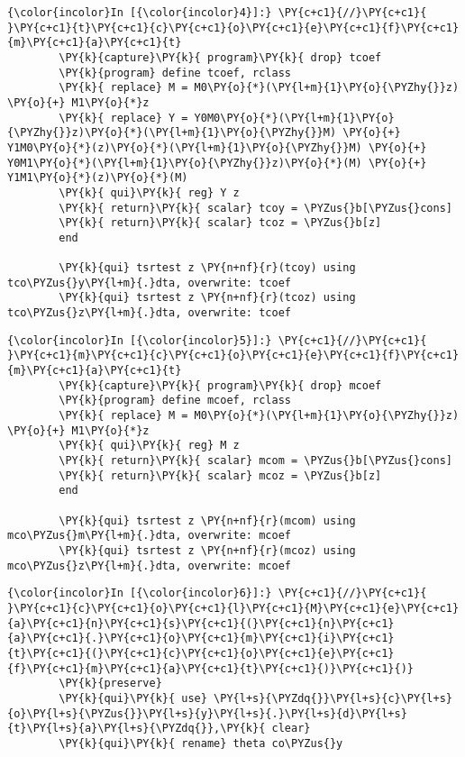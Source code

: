 \documentclass[11pt,notitlepage]{article}\usepackage[]{graphicx}\usepackage[]{color}
\makeatletter
\newenvironment{kframe}{%
 \def\at@end@of@kframe{}%
 \ifinner\ifhmode%
  \def\at@end@of@kframe{\end{minipage}}%
  \begin{minipage}{\columnwidth}%
 \fi\fi%
 \def\FrameCommand##1{\hskip\@totalleftmargin \hskip-\fboxsep
 \colorbox{shadecolor}{##1}\hskip-\fboxsep
     \hskip-\linewidth \hskip-\@totalleftmargin \hskip\columnwidth}%
 \MakeFramed {\advance\hsize-\width
   \@totalleftmargin\z@ \linewidth\hsize
   \@setminipage}}%
 {\par\unskip\endMakeFramed%
 \at@end@of@kframe}
\newenvironment{knitrout}{}{} %
\makeatother
\begin{document}
\begin{enumerate}[a)]
\begin{knitrout}
\begin{kframe}
    \begin{Verbatim}[commandchars=\\\{\}]
{\color{incolor}In [{\color{incolor}4}]:} \PY{c+c1}{//}\PY{c+c1}{ }\PY{c+c1}{t}\PY{c+c1}{c}\PY{c+c1}{o}\PY{c+c1}{e}\PY{c+c1}{f}\PY{c+c1}{m}\PY{c+c1}{a}\PY{c+c1}{t}
        \PY{k}{capture}\PY{k}{ program}\PY{k}{ drop} tcoef
        \PY{k}{program} define tcoef, rclass
        \PY{k}{	replace} M = M0\PY{o}{*}(\PY{l+m}{1}\PY{o}{\PYZhy{}}z) \PY{o}{+} M1\PY{o}{*}z
        \PY{k}{	replace} Y = Y0M0\PY{o}{*}(\PY{l+m}{1}\PY{o}{\PYZhy{}}z)\PY{o}{*}(\PY{l+m}{1}\PY{o}{\PYZhy{}}M) \PY{o}{+} Y1M0\PY{o}{*}(z)\PY{o}{*}(\PY{l+m}{1}\PY{o}{\PYZhy{}}M) \PY{o}{+} Y0M1\PY{o}{*}(\PY{l+m}{1}\PY{o}{\PYZhy{}}z)\PY{o}{*}(M) \PY{o}{+} Y1M1\PY{o}{*}(z)\PY{o}{*}(M)	
        \PY{k}{	qui}\PY{k}{ reg} Y z
        \PY{k}{	return}\PY{k}{ scalar} tcoy = \PYZus{}b[\PYZus{}cons]
        \PY{k}{	return}\PY{k}{ scalar} tcoz = \PYZus{}b[z]
        end
        
        \PY{k}{qui} tsrtest z \PY{n+nf}{r}(tcoy) using tco\PYZus{}y\PY{l+m}{.}dta, overwrite: tcoef
        \PY{k}{qui} tsrtest z \PY{n+nf}{r}(tcoz) using tco\PYZus{}z\PY{l+m}{.}dta, overwrite: tcoef
\end{Verbatim}

    \begin{Verbatim}[commandchars=\\\{\}]
{\color{incolor}In [{\color{incolor}5}]:} \PY{c+c1}{//}\PY{c+c1}{ }\PY{c+c1}{m}\PY{c+c1}{c}\PY{c+c1}{o}\PY{c+c1}{e}\PY{c+c1}{f}\PY{c+c1}{m}\PY{c+c1}{a}\PY{c+c1}{t}
        \PY{k}{capture}\PY{k}{ program}\PY{k}{ drop} mcoef
        \PY{k}{program} define mcoef, rclass
        \PY{k}{	replace} M = M0\PY{o}{*}(\PY{l+m}{1}\PY{o}{\PYZhy{}}z) \PY{o}{+} M1\PY{o}{*}z
        \PY{k}{	qui}\PY{k}{ reg} M z
        \PY{k}{	return}\PY{k}{ scalar} mcom = \PYZus{}b[\PYZus{}cons]
        \PY{k}{	return}\PY{k}{ scalar} mcoz = \PYZus{}b[z]
        end
        
        \PY{k}{qui} tsrtest z \PY{n+nf}{r}(mcom) using mco\PYZus{}m\PY{l+m}{.}dta, overwrite: mcoef 
        \PY{k}{qui} tsrtest z \PY{n+nf}{r}(mcoz) using mco\PYZus{}z\PY{l+m}{.}dta, overwrite: mcoef
\end{Verbatim}

    \begin{Verbatim}[commandchars=\\\{\}]
{\color{incolor}In [{\color{incolor}6}]:} \PY{c+c1}{//}\PY{c+c1}{ }\PY{c+c1}{c}\PY{c+c1}{o}\PY{c+c1}{l}\PY{c+c1}{M}\PY{c+c1}{e}\PY{c+c1}{a}\PY{c+c1}{n}\PY{c+c1}{s}\PY{c+c1}{(}\PY{c+c1}{n}\PY{c+c1}{a}\PY{c+c1}{.}\PY{c+c1}{o}\PY{c+c1}{m}\PY{c+c1}{i}\PY{c+c1}{t}\PY{c+c1}{(}\PY{c+c1}{c}\PY{c+c1}{o}\PY{c+c1}{e}\PY{c+c1}{f}\PY{c+c1}{m}\PY{c+c1}{a}\PY{c+c1}{t}\PY{c+c1}{)}\PY{c+c1}{)}
        \PY{k}{preserve}	
        \PY{k}{qui}\PY{k}{ use} \PY{l+s}{\PYZdq{}}\PY{l+s}{c}\PY{l+s}{o}\PY{l+s}{\PYZus{}}\PY{l+s}{y}\PY{l+s}{.}\PY{l+s}{d}\PY{l+s}{t}\PY{l+s}{a}\PY{l+s}{\PYZdq{}},\PY{k}{ clear}
        \PY{k}{qui}\PY{k}{ rename} theta co\PYZus{}y
        

\end{Verbatim}
\end{kframe}
\end{knitrout}
\end{enumerate}
\end{document}
